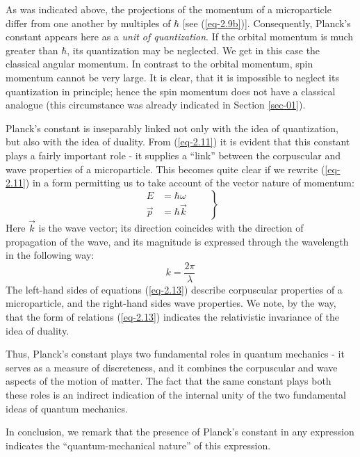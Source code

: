 \documentclass[a4paper,sfsidenotes,colorlinks=true]{tufte-book}
\numberwithin{equation}{section}
\numberwithin{figure}{section}
\begin{document}
As was indicated above, the projections of the momentum of a
microparticle differ from one another by multiples of $\hbar$ [see
(\ref{eq-2.9b})]. Consequently, Planck's constant appears here as a
\emph{unit of quantization}. If the orbital momentum is much greater
than $\hbar$, its quantization may be neglected. We get in this case the
classical angular momentum. In contrast to the orbital momentum, spin
momentum cannot be very large. It is clear, that it is impossible to
neglect its quantization in principle; hence the spin momentum does
not have a classical analogue (this circumstance was already
indicated in Section \ref{sec-01}).

Planck's constant is inseparably linked not only with the
 idea of quantization, but also with the idea of duality. From (\ref{eq-2.11})
 it is evident that this constant plays a fairly important role - it
 supplies a ``link'' between the corpuscular and wave properties of a
 microparticle. This becomes quite clear if we rewrite (\ref{eq-2.11}) in a
 form permitting us to take account of the vector nature of momentum:
\begin{equation}%
\left.
\begin{split}
E & = \hbar \omega\\
\vec{p} & = \hbar \vec{k}
\end{split}
\quad \quad \right\}
\label{eq-2.13} 
\end{equation}
Here $\vec{k}$ is the wave vector; its direction coincides with the
direction of propagation of the wave, and its magnitude is expressed
through the wavelength in the following way: 
\begin{equation*}
k = \frac{2 \pi}{\lambda} 
\end{equation*}
The left-hand sides of equations (\ref{eq-2.13}) describe corpuscular
properties of a microparticle, and the right-hand sides wave
properties. We note, by the way, that the form of relations (\ref{eq-2.13})
indicates the relativistic invariance of the idea of duality.

Thus, Planck's constant plays two fundamental roles in quantum
mechanics - it serves as a measure of discreteness, and it combines
the corpuscular and wave aspects of the motion of matter. The fact
that the same constant plays both these roles is an indirect
indication of the internal unity of the two fundamental ideas of
quantum mechanics.

In conclusion, we remark that the presence of Planck's constant in any
expression indicates the ``quantum-mechanical nature'' of this
expression.
 
\end{document}
